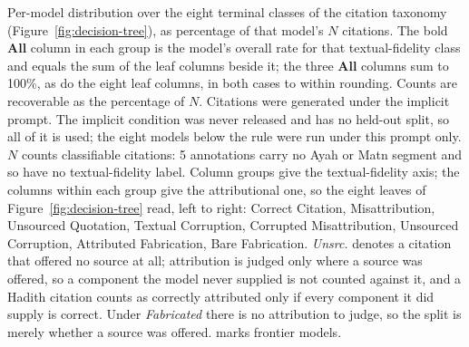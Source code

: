\begin{table}[t]
\caption{Per-model distribution over the eight terminal classes of the citation taxonomy (Figure~\ref{fig:decision-tree}), as percentage of that model's $N$ citations. The bold \textbf{All} column in each group is the model's overall rate for that textual-fidelity class and equals the sum of the leaf columns beside it; the three \textbf{All} columns sum to 100\%, as do the eight leaf columns, in both cases to within rounding. Counts are recoverable as the percentage of $N$. Citations were generated under the implicit prompt. The implicit condition was never released and has no held-out split, so all of it is used; the eight models below the rule were run under this prompt only. $N$ counts classifiable citations: 5 annotations carry no Ayah or Matn segment and so have no textual-fidelity label. Column groups give the textual-fidelity axis; the columns within each group give the attributional one, so the eight leaves of Figure~\ref{fig:decision-tree} read, left to right: Correct Citation, Misattribution, Unsourced Quotation, Textual Corruption, Corrupted Misattribution, Unsourced Corruption, Attributed Fabrication, Bare Fabrication. \emph{Unsrc.} denotes a citation that offered no source at all; attribution is judged only where a source was offered, so a component the model never supplied is not counted against it, and a Hadith citation counts as correctly attributed only if every component it did supply is correct. Under \emph{Fabricated} there is no attribution to judge, so the split is merely whether a source was offered. \fr marks frontier models.}
\label{tab:eight_class_implicit}
\end{table}
